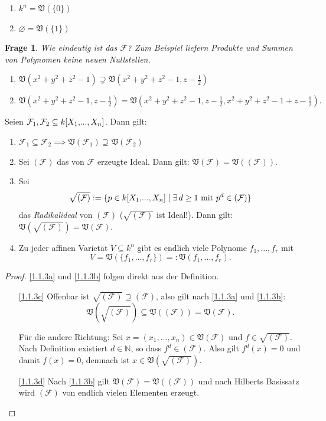 \documentclass[a4paper,12pt]{scrbook}
\newtheorem{q}{Frage}
\newtheorem{proof}{Beweis}
\def\V{\mathfrak{V}}
\newcommand{\F}{\mathcal{F}}
\newcommand{\leer}{\ensuremath{\varnothing}}
\renewcommand{\dotsc}{\ensuremath{\!...}}
\newcommand{\set}[1]{\ensuremath{\mathbb{#1}}}
\newcommand{\N}{\set{N}}
\newcommand{\polyx}[1][n]{\ensuremath%
  [X_{1},\dotsc,X_{#1}]}
\begin{document}
\begin{bsp}\label{bsp1.2}
\begin{enumerate}
\item $k^{n}=\V(\{0\})$
\item $\leer=\V(\{1\})$
\end{enumerate}
\end{bsp}

\begin{q}Wie eindeutig ist das $\F$? Zum Beispiel liefern Produkte und Summen von Polynomen keine neuen Nullstellen.
\end{q}

\begin{nbsp}\begin{enumerate}
\item $\V(x^{2}+y^{2}+z^{2}-1) \supsetneq \V(x^{2}+y^{2}+z^{2}-1, z-\frac{1}{2})$
\item $\V(x^{2}+y^{2}+z^{2}-1, z-\frac{1}{2}) = \V(x^{2}+y^{2}+z^{2}-1, z-\frac{1}{2}, x^{2}+y^{2}+z^{2}-1 + z-\frac{1}{2}).$
\end{enumerate}\end{nbsp}


\begin{bem}\label{1.1.3} Seien $\F_{1},\F_{2}\subseteq k\polyx$. Dann gilt:
\begin{enumerate}
\item{} $\F_{1}\subseteq\F_{2}\implies \V(\F_{1})\supseteq \V(\F_{2})$
\item{} Sei $(\F)$ das von $\F$ erzeugte Ideal. Dann gilt: $\V(\F) = \V((\F))$.
\item{} Sei
\[\sqrt{(\F)}:=\{p\in k\polyx\mid\exists\, d\geq 1\text{ mit }p^{d}\in(\F)\}\]
das \emph{Radikalideal} von $(\F)$ ($\sqrt{(\F)}$ ist Ideal!). Dann gilt: $\V(\sqrt{(\F)})=\V(\F)$.
\item{} Zu jeder affinen Varietät $V\subseteq k^{n}$ gibt es endlich viele Polynome $f_{1},\dotsc,f_{r}$ mit \[V=\V(\{f_{1},\dotsc,f_{r}\})=:\V(f_{1},\dotsc,f_{r}).\]
\end{enumerate}
\end{bem}

\begin{proof}\mbox{} %
\ref{1.1.3a} und \ref{1.1.3b} folgen direkt aus der Definition.
\begin{enumerate}%
\item[\ref{1.1.3c}] Offenbar ist $\sqrt{(\F)}\supseteq(\F)$, also gilt nach \ref{1.1.3a} und \ref{1.1.3b}: 
\[\V(\sqrt{(\F)})\subseteq \V((\F))=\V(\F).\]

Für die andere Richtung: Sei $x=(x_{1},\dotsc,x_{n})\in \V(\F)$ und $f\in\sqrt{(\F)}$. Nach Definition existiert $d\in\N$, so dass $f^{d}\in(\F)$. Also gilt $f^{d}(x)=0$ und damit $f(x)=0$, demnach ist $x\in \V(\sqrt{(\F)})$.
\item[\ref{1.1.3d}] Nach \ref{1.1.3b} gilt $\V(\F)=\V((\F))$ und nach Hilberts Basissatz wird $(\F)$ von endlich vielen Elementen erzeugt.
\end{enumerate}
\end{proof}
\end{document}
